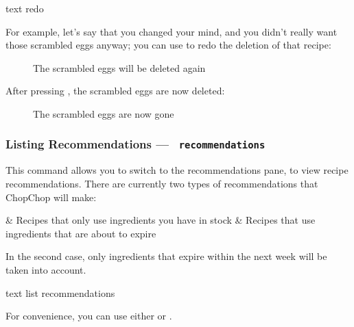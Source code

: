 	 \begin{blockofcode}{text}
		redo
	\end{blockofcode}

	For example, let's say that you changed your mind, and you didn't really want those scrambled eggs anyway; you can use 
	to redo the deletion of that recipe:

	\begin{figure}[!htbp]\centering\ContinuedFloat*
		\caption{The scrambled eggs will be deleted again}
	\end{figure}

	\pagebreak
	After pressing , the scrambled eggs are now deleted:

	\begin{figure}[!htbp]\centering\ContinuedFloat
		\caption{The scrambled eggs are now gone}
	\end{figure}





\hypertarget{ListRecommendationCommand}{}
\subsubsection{Listing Recommendations — \texttt{ recommendations}}

	This command allows you to switch to the recommendations pane, to view recipe recommendations. There are currently two types
	of recommendations that ChopChop will make:

	\begin{romanlist}
		& Recipes that only use ingredients you have in stock
		& Recipes that use ingredients that are about to expire
	\end{romanlist}

	In the second case, only ingredients that expire within the next week will be taken into account.

	 \begin{blockofcode}{text}
		list recommendations
	\end{blockofcode}

	\begin{infobox}
		\bulb{} \hspace{.6em}%
		\parbox{0.9\textwidth}{%
			 For convenience, you can use either  or .
		}
	\end{infobox}

